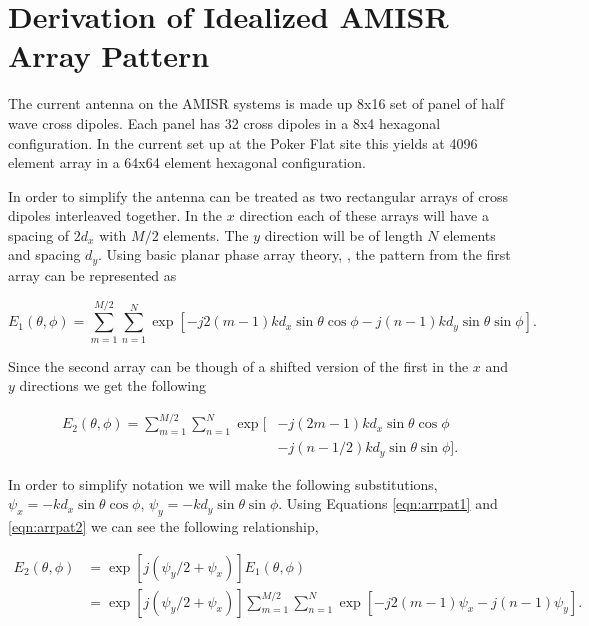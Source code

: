 \chapter{Derivation of Idealized AMISR Array Pattern}
 \label{App:AMISRarr}
\thispagestyle{myheadings}
\graphicspath{{Appendix/Figures/}}

The current antenna on the AMISR systems is made up 8x16 set of panel of half wave cross dipoles. Each panel has 32 cross dipoles in a 8x4 hexagonal configuration. In the current set up at the Poker Flat site this yields at 4096 element array in a 64x64 element hexagonal configuration.

In order to simplify the antenna can be treated as two rectangular arrays of cross dipoles interleaved together. In the $x$ direction each of these arrays will have a spacing of $2d_x$ with $M/2$ elements. The $y$ direction will be of length $N$ elements and spacing $d_y$. Using basic planar phase array theory, \citep{Balanis:2005:ATA:1208379}, the pattern from the first array can be represented as 

\begin{equation}
\label{eqn:arrpat1}
E_1(\theta,\phi) =\displaystyle \sum_{m=1}^{M/2}\sum_{n=1}^{N} \exp\left[-j2\left(m-1\right)kd_x\sin\theta\cos\phi -j\left(n-1\right) k d_y\sin\theta\sin\phi\right].
\end{equation}

\noindent Since the second array can be though of a shifted version of the first in the $x$ and $y$ directions we get the following

\begin{equation}
\label{eqn:arrpat2}
\begin{split}
E_2(\theta,\phi) =\displaystyle \sum_{m=1}^{M/2}\sum_{n=1}^{N} \exp[&-j\left(2m-1\right)kd_x\sin\theta\cos\phi \\ &-j\left(n-1/2\right) k d_y\sin\theta\sin\phi].
\end{split}
\end{equation}

In order to simplify notation we will make the following substitutions, $\psi_x = -k d_x\sin\theta\cos\phi$, $\psi_y = -k d_y\sin\theta\sin\phi$. Using Equations \ref{eqn:arrpat1} and \ref{eqn:arrpat2} we can see the following relationship,

\begin{equation}
\label{eqn:arrpateqn}
\begin{split}
E_2(\theta,\phi)  &=  \exp\left[j(\psi_y/2 + \psi_x)\right] E_1(\theta,\phi)  \\&= \exp\left[j(\psi_y/2 + \psi_x)\right]  \displaystyle \sum_{m=1}^{M/2}\sum_{n=1}^{N}  \exp\left[-j2\left(m-1\right) \psi_x -j\left(n-1\right) \psi_y\right].
\end{split}
\end{equation}

